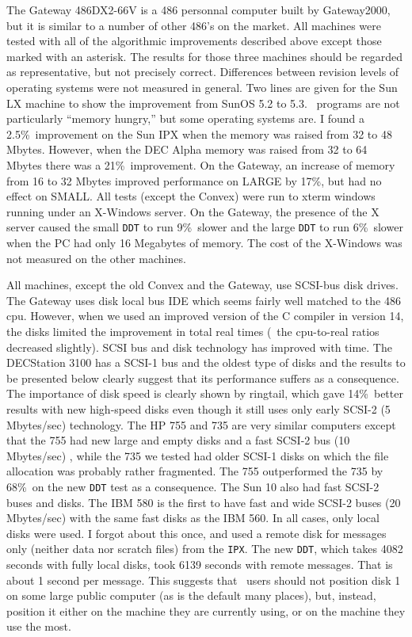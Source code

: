 The Gateway 486DX2-66V is a 486 personnal computer built by
Gateway2000, but it is similar to a number of other 486's on the
market.  All machines were tested with all of the algorithmic
improvements described above except those marked with an asterisk.
The results for those three machines should be regarded as
representative, but not precisely correct.  Differences between
revision levels of operating systems were not measured in general.
Two lines are given for the Sun LX machine to show the improvement
from SunOS 5.2 to 5.3.  \AIPS\ programs are not
particularly ``memory hungry,'' but some operating systems are.  I
found a 2.5\%\ improvement on the Sun IPX when the memory was raised
from 32 to 48 Mbytes.  However, when the DEC Alpha memory was raised
from 32 to 64 Mbytes there was a 21\%\ improvement.  On the Gateway,
an increase of memory from 16 to 32 Mbytes improved performance on
LARGE by 17\%, but had no effect on \hbox{SMALL}.  All tests (except
the Convex) were run to xterm windows running under an X-Windows
server.  On the Gateway, the presence of the X server caused the small
{\tt DDT} to run 9\%\ slower and the large {\tt DDT} to run 6\%\
slower when the PC had only 16 Megabytes of memory.  The cost of the
X-Windows was not measured on the other machines.

All machines, except the old Convex and the Gateway, use SCSI-bus disk
drives.  The Gateway uses disk local bus \hbox{IDE} which seems fairly
well matched to the 486 cpu.  However, when we used an improved
version of the C compiler in version 14, the disks limited the
improvement in total real times (\ie\ the cpu-to-real ratios decreased
slightly).  SCSI bus and disk technology has improved with time.  The
DECStation 3100 has a SCSI-1 bus and the oldest type of disks and the
results to be presented below clearly suggest that its performance
suffers as a consequence.  The importance of disk speed is clearly
shown by ringtail, which gave 14\%\ better results with new high-speed
disks even though it still uses only early SCSI-2 (5 Mbytes/sec)
technology.  The HP 755 and 735 are very similar computers except that
the 755 had new large and empty disks and a fast SCSI-2 bus (10
Mbytes/sec) , while the 735 we tested had older SCSI-1 disks on which
the file allocation was probably rather fragmented.  The 755
outperformed the 735 by 68\%\ on the new {\tt DDT} test as a
consequence.  The Sun 10 also had fast SCSI-2 buses and disks.  The
IBM 580 is the first to have fast and wide SCSI-2 buses (20
Mbytes/sec) with the same fast disks as the IBM 560.  In all cases,
only local disks were used.  I forgot about this once, and used a
remote disk for messages only (neither data nor scratch files) from
the {\tt IPX}.  The new {\tt DDT}, which takes 4082 seconds with fully
local disks, took 6139 seconds with remote messages.  That is about 1
second per message.  This suggests that \AIPS\ users should not
position disk 1 on some large public computer (as is the default many
places), but, instead, position it either on the machine they are
currently using, or on the machine they use the most.

